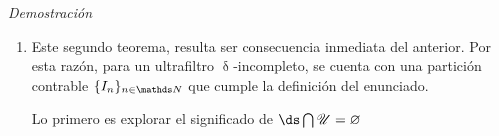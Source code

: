 \documentclass{article}
\theoremstyle{definition}
\theoremstyle{theorem*}
\begin{document}
\begin{proofbox}{\textit{Demostración}}
\begin{enumerate}
          En el otro sentio, con ultrafiltro $\U$ sobre $I$ y una partición contable
          de $I$, $\{I_n\}_{n\in\N}$ tal como se define en el enunciado. Se tiene entonces que, para todo $n\in\N$, $I-I_n \in \U$. Por lo que se define $F_n = I - I_n$. solo
          hace falta ver que la intersección de todos los $F_n$ no esté en $\U$.
          \[
            \begin{derivation}
                \res{\bigcap_{n\in\N}F_n}\\
              =\\
                \res{ \bigcap_{n\in\N}(I - I_n) }\\
              =\\
                \res{ I - \bigcup{n\in\N}I_n }\\
              =\\
                \res{ I - I }\\
              =\\
                \res{ \varnothing }\\
              \not\in\\
                \res{\U}
            \end{derivation}
          \]

          Así, se concluye la demostración de esta caracterización de los ultrafiltros
          $\updelta$-incompletos.

    \item Este segundo teorema, resulta ser consecuencia inmediata del anterior.
    Por esta razón, para un ultrafiltro $\updelta$-incompleto, se cuenta con una
    partición contrable $\{I_n\}_{n\in\N}$ que cumple la definición del enunciado.
    
    Lo primero es explorar el significado de $\ds\bigcap\U=\varnothing$

    \begin{longderivation}
        \res{ \bigcap\U = \varnothing }\\
      \equiv\\
        \res{ \lnot \bigcap\U \not= \varnothing }\\
      \equiv\\
        \\
      \equiv\\
        \\
      \equiv\\
    \end{longderivation}


\end{enumerate}
\end{proofbox}
\end{document}
